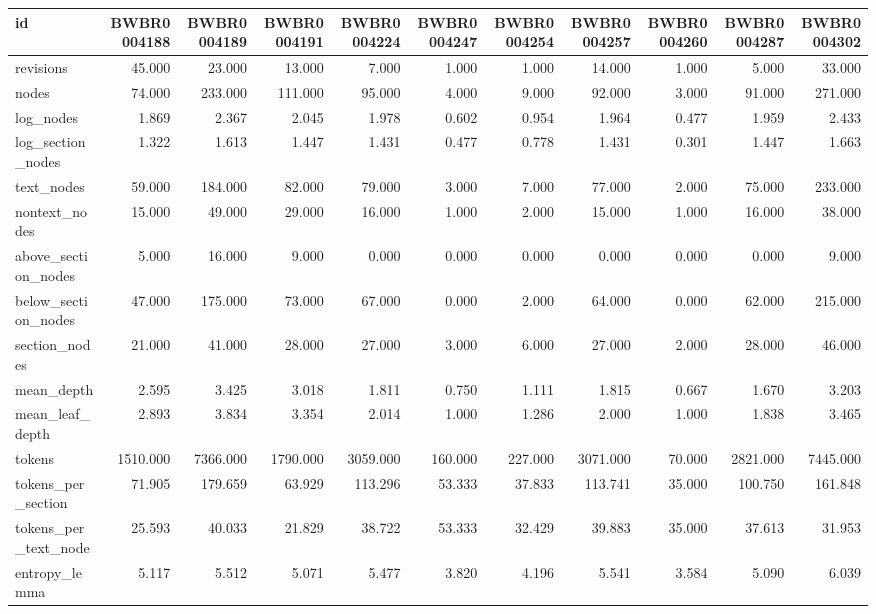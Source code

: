 \begin{tabular}{lrrrrrrrrrr}
\toprule
id & BWBR0004188 & BWBR0004189 & BWBR0004191 & BWBR0004224 & BWBR0004247 & BWBR0004254 & BWBR0004257 & BWBR0004260 & BWBR0004287 & BWBR0004302 \\
\midrule
revisions & 45.000 & 23.000 & 13.000 & 7.000 & 1.000 & 1.000 & 14.000 & 1.000 & 5.000 & 33.000 \\
\cline{1-11}
nodes & 74.000 & 233.000 & 111.000 & 95.000 & 4.000 & 9.000 & 92.000 & 3.000 & 91.000 & 271.000 \\
\cline{1-11}
log\_nodes & 1.869 & 2.367 & 2.045 & 1.978 & 0.602 & 0.954 & 1.964 & 0.477 & 1.959 & 2.433 \\
\cline{1-11}
log\_section\_nodes & 1.322 & 1.613 & 1.447 & 1.431 & 0.477 & 0.778 & 1.431 & 0.301 & 1.447 & 1.663 \\
\cline{1-11}
text\_nodes & 59.000 & 184.000 & 82.000 & 79.000 & 3.000 & 7.000 & 77.000 & 2.000 & 75.000 & 233.000 \\
\cline{1-11}
nontext\_nodes & 15.000 & 49.000 & 29.000 & 16.000 & 1.000 & 2.000 & 15.000 & 1.000 & 16.000 & 38.000 \\
\cline{1-11}
above\_section\_nodes & 5.000 & 16.000 & 9.000 & 0.000 & 0.000 & 0.000 & 0.000 & 0.000 & 0.000 & 9.000 \\
\cline{1-11}
below\_section\_nodes & 47.000 & 175.000 & 73.000 & 67.000 & 0.000 & 2.000 & 64.000 & 0.000 & 62.000 & 215.000 \\
\cline{1-11}
section\_nodes & 21.000 & 41.000 & 28.000 & 27.000 & 3.000 & 6.000 & 27.000 & 2.000 & 28.000 & 46.000 \\
\cline{1-11}
mean\_depth & 2.595 & 3.425 & 3.018 & 1.811 & 0.750 & 1.111 & 1.815 & 0.667 & 1.670 & 3.203 \\
\cline{1-11}
mean\_leaf\_depth & 2.893 & 3.834 & 3.354 & 2.014 & 1.000 & 1.286 & 2.000 & 1.000 & 1.838 & 3.465 \\
\cline{1-11}
tokens & 1510.000 & 7366.000 & 1790.000 & 3059.000 & 160.000 & 227.000 & 3071.000 & 70.000 & 2821.000 & 7445.000 \\
\cline{1-11}
tokens\_per\_section & 71.905 & 179.659 & 63.929 & 113.296 & 53.333 & 37.833 & 113.741 & 35.000 & 100.750 & 161.848 \\
\cline{1-11}
tokens\_per\_text\_node & 25.593 & 40.033 & 21.829 & 38.722 & 53.333 & 32.429 & 39.883 & 35.000 & 37.613 & 31.953 \\
\cline{1-11}
entropy\_lemma & 5.117 & 5.512 & 5.071 & 5.477 & 3.820 & 4.196 & 5.541 & 3.584 & 5.090 & 6.039 \\

\end{tabular}
